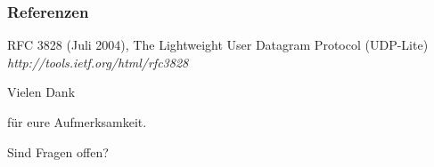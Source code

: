\documentclass{beamer}
\begin{document}
\begin{frame}
\frametitle{Referenzen}
\footnotesize{
\begin{thebibliography}{99} %
 RFC 3828 (Juli 2004), 
\newblock The Lightweight User Datagram Protocol (UDP-Lite)
\newblock \emph{http://tools.ietf.org/html/rfc3828}
\end{thebibliography}
}
\end{frame}


\begin{frame}
\Huge{\centerline{Vielen Dank}}
\Huge{\centerline{für eure Aufmerksamkeit.}}
\Huge{\centerline{}}
\Huge{\centerline{Sind Fragen offen?}}
\end{frame}

\end{document}
